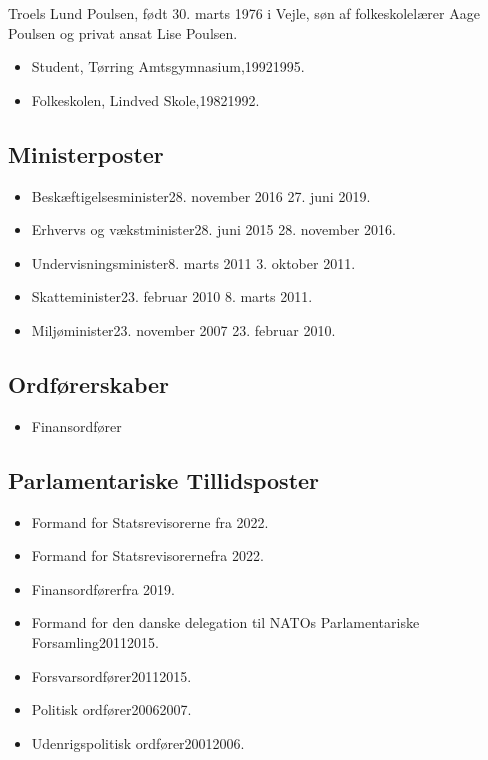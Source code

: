 \documentclass[11pt, a4paper]{awesome-cv}
\begin{document}
\makecvheader[R]
\makelettertitle
\begin{cvletter}
Troels Lund Poulsen, født 30. marts 1976 i Vejle, søn af folkeskolelærer Aage Poulsen og privat ansat Lise Poulsen.

\begin{itemize}
\item Student, Tørring Amtsgymnasium,19921995.
\item Folkeskolen, Lindved Skole,19821992.
\end{itemize}
\subsection*{Ministerposter}
\begin{itemize}
\item Beskæftigelsesminister28. november 2016  27. juni 2019.
\item Erhvervs og vækstminister28. juni 2015  28. november 2016.
\item Undervisningsminister8. marts 2011  3. oktober 2011.
\item Skatteminister23. februar 2010  8. marts 2011.
\item Miljøminister23. november 2007  23. februar 2010.
\end{itemize}
\subsection*{Ordførerskaber}
\begin{itemize}
\item Finansordfører
\end{itemize}
\subsection*{Parlamentariske Tillidsposter}
\begin{itemize}
\item Formand for Statsrevisorerne fra 2022.
\item Formand for Statsrevisorernefra 2022.
\item Finansordførerfra 2019.
\item Formand for den danske delegation til NATOs Parlamentariske Forsamling20112015.
\item Forsvarsordfører20112015.
\item Politisk ordfører20062007.
\item Udenrigspolitisk ordfører20012006.
\end{itemize}

\end{cvletter}
\end{document}
